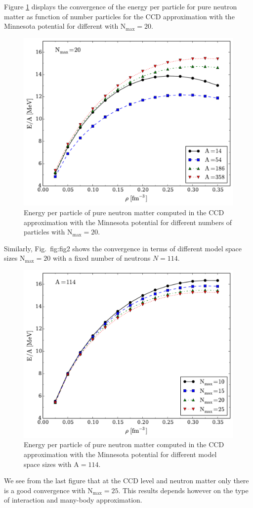 Figure \ref{fig:fig1} displays the convergence of the energy per particle for pure neutron matter as function of number particles 
for  the CCD approximation with the Minnesota potential for different with $\mathrm{N_{max}=20}$.
  \begin{figure}
    \includegraphics[width=\linewidth]{Chapter8-figures/fig1.pdf}
    \caption{Energy per particle of pure neutron matter computed in
      the CCD approximation with the Minnesota potential for different
      numbers of particles with $\mathrm{N_{max}=20}$.}
    \label{fig:fig1}
  \end{figure}
Similarly, Fig.~{fig:fig2} shows the convergence in terms of different model space sizes $\mathrm{N_{max}=20}$ with 
a fixed number of neutrons $N=114$. 
  \begin{figure}
    \includegraphics[width=\linewidth]{Chapter8-figures/fig2.pdf}
    \caption{Energy per particle of pure neutron matter computed in
      the CCD approximation with the Minnesota potential for different
      model space sizes with $\mathrm{A=114}$.}
    \label{fig:fig2}
  \end{figure}
We see from the last figure that at the CCD level and neutron matter only there is a good convergence with  $\mathrm{N_{max}=25}$.
This results depends however on the type of interaction and many-body approximation. 

